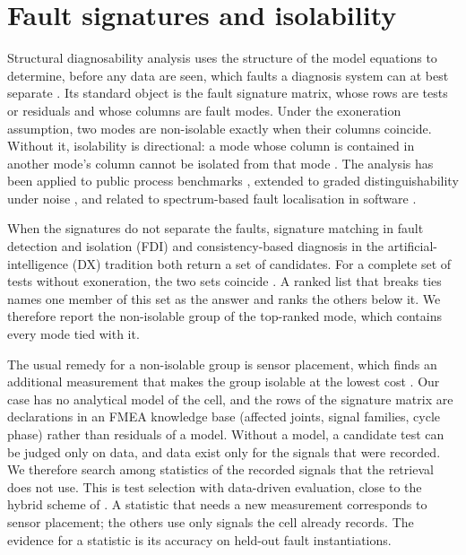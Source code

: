 \documentclass{ifacconf}
\begin{document}
\section{Fault signatures and isolability}

Structural diagnosability analysis uses the structure of the model equations
to determine, before any data are seen, which faults a diagnosis system can at
best separate \citep{blanke,krysander_mso}. Its standard object is the fault
signature matrix, whose rows are tests or residuals and whose columns are fault
modes. Under the exoneration assumption, two modes are non-isolable exactly when
their columns coincide. Without it, isolability is directional: a mode whose
column is contained in another mode's column cannot be isolated from that mode
\citep{krysander,cordier}. The analysis has been applied to public process
benchmarks \citep{damadics}, extended to graded distinguishability under noise
\citep{jung}, and related to spectrum-based fault localisation in software
\citep{tm_wotawa}.

When the signatures do not separate the faults, signature matching in fault
detection and isolation (FDI) and consistency-based diagnosis in the
artificial-intelligence (DX) tradition \citep{reiter,dekleer} both return a set
of candidates. For a complete set of tests without exoneration, the two sets
coincide \citep{cordier,tm_survey}. A ranked list that breaks ties names one
member of this set as the answer and ranks the others below it. We therefore
report the non-isolable group of the top-ranked mode, which contains every mode
tied with it.

The usual remedy for a non-isolable group is sensor placement, which finds an
additional measurement that makes the group isolable at the lowest cost
\citep{krysander,frisk}. Our case has no analytical model of the cell, and the
rows of the signature matrix are declarations in an FMEA knowledge base
(affected joints, signal families, cycle phase) rather than residuals of a
model. Without a model, a candidate test can be judged only on data, and data
exist only for the signals that were recorded. We therefore search among
statistics of the recorded signals that the retrieval does not use. This is test
selection with data-driven evaluation, close to the hybrid scheme of
\citet{jung18}. A statistic that needs a new measurement corresponds to sensor
placement; the others use only signals the cell already records. The evidence
for a statistic is its accuracy on held-out fault instantiations.
\end{document}
